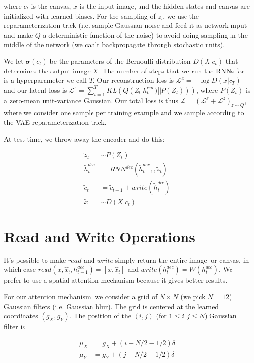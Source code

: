 \documentclass[a4paper]{article}
\begin{document}
where $c_t$ is the canvas, $x$ is the input image, and the hidden states
and canvas are initialized with learned biases. For the sampling of $z_t$, we
use the reparameterization trick (i.e. sample Gaussian noise and feed it
as network input and make $Q$ a deterministic function of the noise) to avoid
doing sampling in the middle of the network (we can't backpropagate through
stochastic units).

We let $\bm{\sigma}(c_t)$ be the parameters of the Bernoulli distribution
$D(X|c_t)$ that determines the output image $X$. The number of steps that we run
the RNNs for is a hyperparameter we call $T$. Our reconstruction loss is
$\mathcal{L}^{x} = -\log{D(x | c_T)}$ and our latent loss is
$\mathcal{L}^{z} = \sum_{t=1}^{T}{KL(Q(Z_t | h_t^{enc}) || P(Z_t)))}$, where
$P(Z_t)$ is a zero-mean unit-variance Gaussian. Our total loss is thus
$\mathcal{L} = (\mathcal{L}^x + \mathcal{L}^z)_{z \sim Q}$, where we consider
one sample per training example and we sample according to the
VAE reparameterization trick.

At test time, we throw away the encoder and do this:

\begin{align}
  \tilde{z}_t &\sim P(Z_t) \\
  \tilde{h}_t^{dec} &= RNN^{dec}(\tilde{h}_{t-1}^{dec}, \tilde{z}_t) \\
  \tilde{c}_t &= \tilde{c}_{t-1} + write(\tilde{h}_{t}^{dec}) \\
  \tilde{x} &\sim D(X | c_t)
\end{align}

\section{Read and Write Operations}
It's possible to make $read$ and $write$ simply return the entire image,
or canvas, in which case $read(x, \hat{x}_t, h_{t-1}^{dec}) =
[x, \hat{x}_t]$ and $write(h_t^{dec}) = W(h_t^{dec})$. We prefer to use a
spatial attention mechanism because it gives better results.

For our attention mechanism, we consider a grid of $N \times N$ (we pick
$N = 12$) Gaussian filters (i.e. Gaussian blur). The grid is centered at the
learned coordinates $(g_X, g_Y)$. The position of the $(i, j)$ (for
$1 \leq i, j \leq N$) Gaussian filter is

\begin{align}
  \mu_X &= g_X + (i - N/2 - 1/2) \delta \\
  \mu_Y &= g_Y + (j - N/2 - 1/2) \delta
\end{align}
\end{document}
